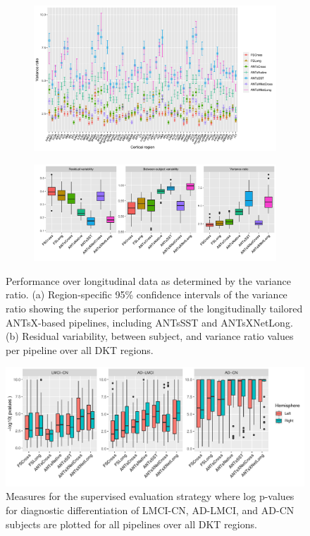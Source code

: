 \documentclass[
  12pt,
]{article}
\begin{document}
\begin{figure}[!htb]
  \centering
  \begin{subfigure}{0.95\textwidth}
    \centering
    \includegraphics[width=1.0\linewidth]{Figures/variance.ratio_FINALX.png}
    \caption{}
  \end{subfigure}
  \begin{subfigure}{0.95\textwidth}
    \centering
    \includegraphics[width=1\linewidth]{Figures/allData_FINALX2.png}
    \caption{}
  \end{subfigure}
  \caption{Performance over longitudinal data as determined by the variance ratio.
    (a) Region-specific 95\% confidence intervals of the variance ratio showing the
    superior performance of the longitudinally tailored ANTsX-based pipelines, including
    ANTsSST and ANTsXNetLong. (b) Residual variability, between subject, and variance ratio
    values per pipeline over all DKT regions. }
\label{fig:longeval1}
\end{figure}

\begin{figure}[!htb]
  \centering
    \includegraphics[width=1.0\linewidth]{Figures/logPvalues2.pdf}
  \caption{Measures for the supervised evaluation
  strategy where log p-values for diagnostic
  differentiation of LMCI-CN, AD-LMCI, and AD-CN subjects are plotted for all pipelines
  over all DKT regions. }
  \label{fig:longeval2}
\end{figure}
\end{document}
